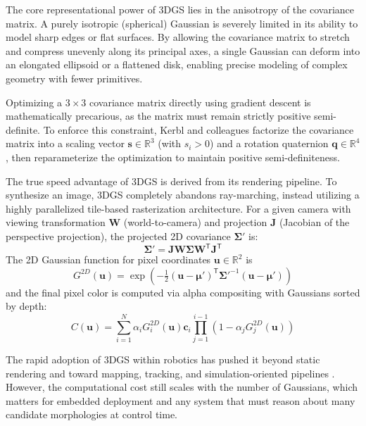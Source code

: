\documentclass[12pt,a4paper,oneside]{report}
\begin{document}
The core representational power of 3DGS lies in the anisotropy of the covariance matrix. A purely isotropic (spherical) Gaussian is severely limited in its ability to model sharp edges or flat surfaces. By allowing the covariance matrix to stretch and compress unevenly along its principal axes, a single Gaussian can deform into an elongated ellipsoid or a flattened disk, enabling precise modeling of complex geometry with fewer primitives.

Optimizing a $3 \times 3$ covariance matrix directly using gradient descent is mathematically precarious, as the matrix must remain strictly positive semi-definite. To enforce this constraint, Kerbl and colleagues factorize the covariance matrix into a scaling vector $\mathbf{s} \in \mathbb{R}^3$ (with $s_i > 0$) and a rotation quaternion $\mathbf{q} \in \mathbb{R}^4$, then reparameterize the optimization to maintain positive semi-definiteness.

\begin{sloppypar}
The true speed advantage of 3DGS is derived from its rendering pipeline. To synthesize an image, 3DGS completely abandons ray-marching, instead utilizing a highly parallelized tile-based rasterization architecture. For a given camera with viewing transformation $\mathbf{W}$ (world-to-camera) and projection $\mathbf{J}$ (Jacobian of the perspective projection), the projected 2D covariance $\boldsymbol{\Sigma}'$ is:
\begin{equation}
\boldsymbol{\Sigma}' = \mathbf{J} \mathbf{W} \boldsymbol{\Sigma} \mathbf{W}^\mathsf{T} \mathbf{J}^\mathsf{T}
\end{equation}
The 2D Gaussian function for pixel coordinates $\mathbf{u} \in \mathbb{R}^2$ is
\[
G^{2D}(\mathbf{u}) = \exp\left(-\tfrac{1}{2} (\mathbf{u} - \boldsymbol{\mu}')^\mathsf{T} \boldsymbol{\Sigma}'^{-1} (\mathbf{u} - \boldsymbol{\mu}')\right)
\]
and the final pixel color is computed via alpha compositing with Gaussians sorted by depth:
\begin{equation}
C(\mathbf{u}) = \sum_{i=1}^{N} \alpha_i G_i^{2D}(\mathbf{u}) \mathbf{c}_i \prod_{j=1}^{i-1} (1 - \alpha_j G_j^{2D}(\mathbf{u}))
\end{equation}
\end{sloppypar}

The rapid adoption of 3DGS within robotics has pushed it beyond static rendering and toward mapping, tracking, and simulation-oriented pipelines \cite{matsuki2024gaussian, keetha2024splattam, guedon2024sugar, lassanske2024gaurast}. However, the computational cost still scales with the number of Gaussians, which matters for embedded deployment and any system that must reason about many candidate morphologies at control time.
\end{document}
